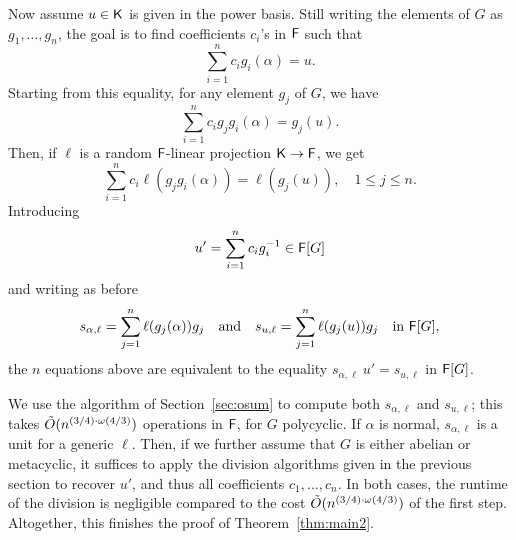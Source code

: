Now assume $u \in {\mathsf{K}}$ is given in the power basis. Still writing the
elements of $G$ as $g_1,\dots,g_n$, the goal is to find coefficients
$c_i$'s in ${\mathsf{F}}$ such that
$$ \sum_{i = 1}^{n} c_i g_i(\alpha) = u.$$ Starting from this
equality, for any element $g_j$ of $G$, we have
$$ \sum_{i = 1}^{n} c_i g_jg_i(\alpha) = g_j(u).$$
Then, if $\ell$ is a random ${\mathsf{F}}$-linear projection ${\mathsf{K}}\to{\mathsf{F}}$, we get 
$$\sum_{i = 1}^{n} c_i \ell(g_jg_i(\alpha)) = \ell(g_j(u)), \quad  1 \le j \le n.$$
Introducing 
$$u'= \sum_{i=1}^{n} c_i g_i^{-1} \in {\mathsf{F}}[G]$$
and writing as before
$$s_{\alpha,\ell}=\sum_{j=1}^{n} \ell(g_j(\alpha))g_j
\quad\text{and}\quad
s_{u,\ell} = \sum_{j=1}^{n}\ell(g_j(u)) g_j \quad\text{in~} {\mathsf{F}}[G],$$ the
$n$ equations above are equivalent to the equality
$s_{\alpha,\ell}\ u' = s_{u,\ell}$ in ${\mathsf{F}}[G]$.

We use the algorithm of Section~\ref{sec:osum} to compute both
$s_{\alpha,\ell}$ and $s_{u,\ell}$; this takes $\tilde{O}(n^{(3/4)\cdot \omega(4/3)})$
operations in ${\mathsf{F}}$, for $G$ polycyclic. If $\alpha$ is normal,
$s_{\alpha,\ell}$ is a unit for a generic $\ell$. Then, if we further
assume that $G$ is either abelian or metacyclic, it suffices to apply
the division algorithms given in the previous section to recover $u'$,
and thus all coefficients $c_1,\dots,c_n$. In both cases, the runtime
of the division is negligible compared to the cost $\tilde{O}(n^{(3/4)\cdot \omega(4/3)})$ of
the first step. Altogether, this finishes the proof of
Theorem~\ref{thm:main2}.


 
